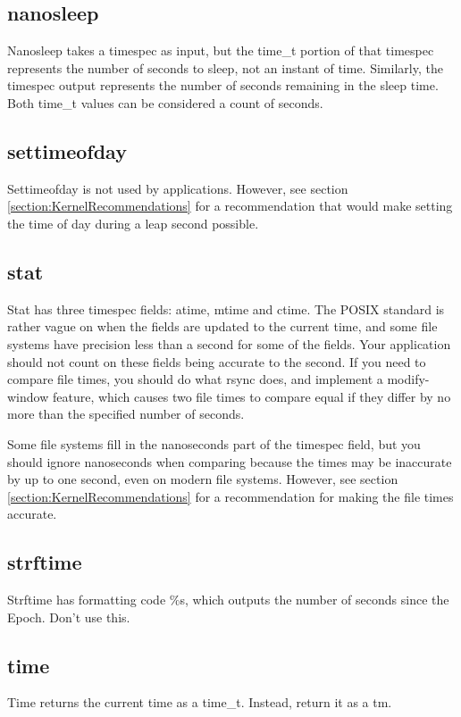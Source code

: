 \documentclass[letterpaper,twoside]{article}
\begin{document}
\subsection{nanosleep}
Nanosleep takes a timespec as input, but the {\ttfamily time\_t} portion of that
timespec represents the number of seconds to sleep, not an instant of
time.  Similarly, the timespec output represents the number of seconds
remaining in the sleep time.  Both {\ttfamily time\_t} values can be considered
a count of seconds.

\subsection{settimeofday}
Settimeofday is not used by applications.
However, see section \ref{section:KernelRecommendations} for a recommendation
that would make setting the time of day during a leap second possible.

\subsection{stat}
Stat has three timespec fields: atime, mtime and ctime.  The POSIX standard
is rather vague on when the fields are updated to the current time, and
some file systems have precision less than a second for some of the fields.
Your application should not count on these fields being accurate to
the second.  If you need to compare file times, you should do what
rsync does, and implement a modify-window feature, which causes two
file times to compare equal if they differ by no more than the specified
number of seconds.

Some file systems fill in the nanoseconds part of the timespec field,
but you should ignore nanoseconds when comparing because the times may be
inaccurate by up to one second, even on modern file systems.
However, see section \ref{section:KernelRecommendations} for a
recommendation for making the file times accurate.

\subsection{strftime}
Strftime has formatting code \%s, which outputs the number of seconds
since the Epoch.  Don't use this.

\subsection{time}
Time returns the current time as a {\ttfamily time\_t}.
Instead, return it as a {\ttfamily tm}.
\inputminted[firstline=34]{c}{src/time_current_tm.c}
\end{document}
